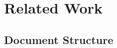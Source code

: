 
%

\makeatletter
\newcommand{\ntifpkgloaded}{%
  \@ifpackageloaded%
}
\makeatother


\chapter{Related Work}
\label{cha:related_work}


\section{Document Structure} %
\label{sec:document_structure}
